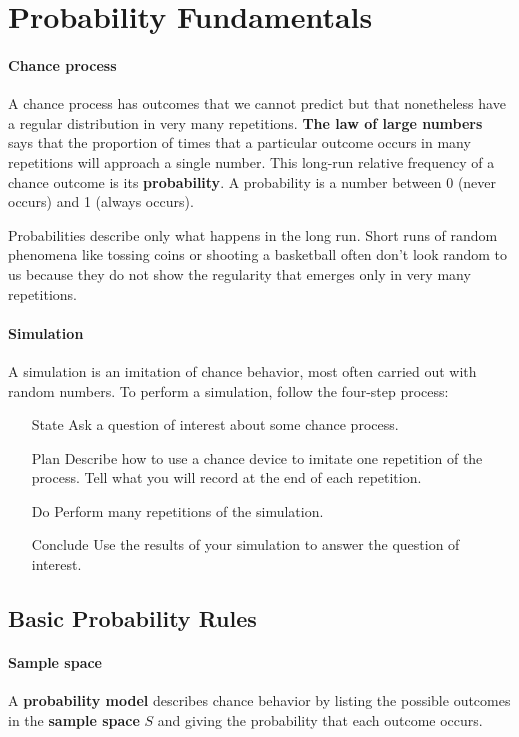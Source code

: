 \section{Probability Fundamentals}

\paragraph{Chance process}
A {chance process} has outcomes that we cannot predict but that nonetheless have a regular distribution in very many repetitions. \textbf{The law of large numbers} says that the proportion of times that a particular outcome occurs in many repetitions will approach a single number. This long-run relative frequency of a chance outcome is its \textbf{probability}. A probability is a number between 0 (never occurs) and 1 (always occurs).

Probabilities describe only what happens in the long run. Short runs of random phenomena like tossing coins or shooting a basketball often don't look random to us because they do not show the regularity that emerges only in very many repetitions.

\paragraph{Simulation}
A {simulation} is an imitation of chance behavior, most often carried out with random numbers. To perform a simulation, follow the four-step process:
\begin{itemize}[font=\sffamily\bfseries, leftmargin=1.95cm, style=nextline, itemsep=0cm]
\item[State] Ask a question of interest about some chance process.
\item[Plan] Describe how to use a chance device to imitate one repetition of the process. Tell what you will record at the end of each repetition.
\item[Do] Perform many repetitions of the simulation.
\item[Conclude] Use the results of your simulation to answer the question of interest.
\end{itemize}

\subsection{Basic Probability Rules}

\paragraph{Sample space}
A \textbf{probability model} describes chance behavior by listing the possible outcomes in the \textbf{sample space} $S$ and giving the probability that each outcome occurs.

